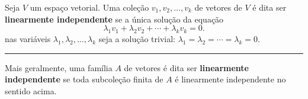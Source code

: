 \begin{definition}
	Seja $V$ um espaço vetorial. Uma coleção $v_1,v_2,\ldots,v_k$ de vetores de $V$ é dita ser \textbf{linearmente independente} se a única solução da equação
	\[\lambda_1v_1+\lambda_2v_2+\cdots+\lambda_kv_k=0.\]
	nas variáveis $\lambda_1,\lambda_2,\ldots,\lambda_k$ seja a solução trivial: $\lambda_1=\lambda_2=\cdots=\lambda_k=0$.
	
	\hrule
	
	Mais geralmente, uma família $A$ de vetores é dita ser \textbf{linearmente independente} se toda subcoleção finita de $A$ é linearmente independente no sentido acima.
\end{definition}